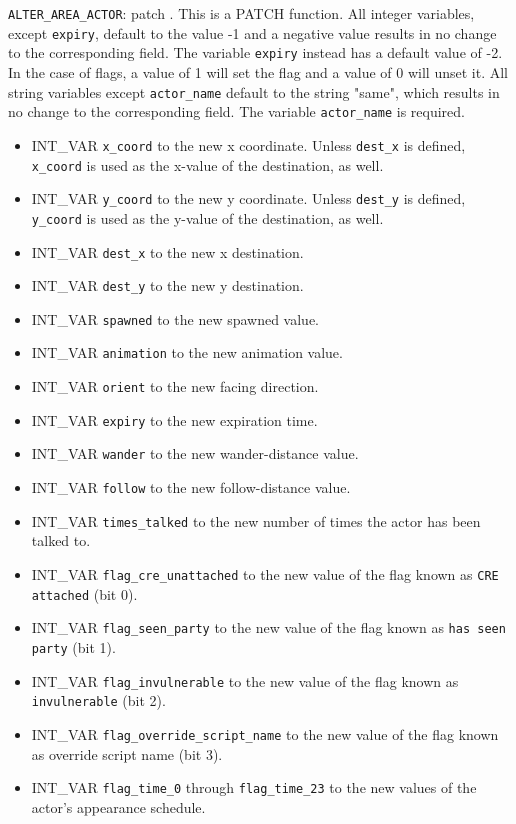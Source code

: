 \documentclass{article}
\def\t#1{{\tt #1}}
\begin{document}
\verb+ALTER_AREA_ACTOR+: patch .
This is a PATCH function. All integer variables, except \verb+expiry+, default to the value -1 and a negative value results in no change to the corresponding field. The variable \verb+expiry+ instead has a default value of -2. In the case of flags, a value of 1 will set the flag and a value of 0 will unset it. All string variables except \verb+actor_name+ default to the string "same", which results in no change to the corresponding field. The variable \verb+actor_name+ is required.
\begin{itemize}
\item INT_VAR \verb+x_coord+ to the new x coordinate. Unless \verb+dest_x+ is defined, \verb+x_coord+ is used as the x-value of the destination, as well.
\item INT_VAR \verb+y_coord+ to the new y coordinate. Unless \verb+dest_y+ is defined, \verb+y_coord+ is used as the y-value of the destination, as well.
\item INT_VAR \verb+dest_x+ to the new x destination.
\item INT_VAR \verb+dest_y+ to the new y destination.
\item INT_VAR \verb+spawned+ to the new spawned value.
\item INT_VAR \verb+animation+ to the new animation value.
\item INT_VAR \verb+orient+ to the new facing direction.
\item INT_VAR \verb+expiry+ to the new expiration time.
\item INT_VAR \verb+wander+ to the new wander-distance value.
\item INT_VAR \verb+follow+ to the new follow-distance value.
\item INT_VAR \verb+times_talked+ to the new number of times the actor has been talked to.
\item INT_VAR \verb+flag_cre_unattached+ to the new value of the flag known as \t{CRE attached} (bit 0).
\item INT_VAR \verb+flag_seen_party+ to the new value of the flag known as \t{has seen party} (bit 1).
\item INT_VAR \verb+flag_invulnerable+ to the new value of the flag known as \t{invulnerable} (bit 2).
\item INT_VAR \verb+flag_override_script_name+ to the new value of the flag known as {override script name} (bit 3).
\item INT_VAR \verb+flag_time_0+ through \verb+flag_time_23+ to the new values of the actor's appearance schedule.

\end{itemize}
\end{document}
